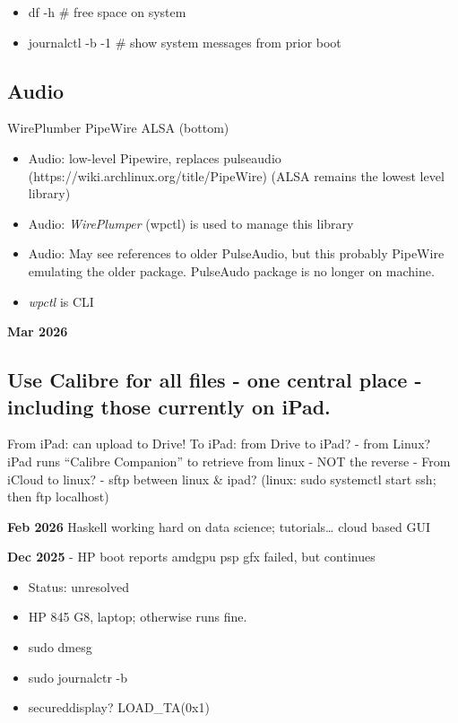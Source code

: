 \documentclass[
]{report}
\providecommand{\tightlist}{%
  \setlength{\itemsep}{0pt}\setlength{\parskip}{0pt}}\usepackage{longtable,booktabs,array}
\begin{document}
\begin{itemize}
\tightlist
\item
  df -h \# free space on system
\item
  journalctl -b -1 \# show system messages from prior boot
\end{itemize}

\subsection{Audio}\label{audio}

WirePlumber PipeWire ALSA (bottom)

\begin{itemize}
\tightlist
\item
  Audio: low-level Pipewire, replaces pulseaudio
  (https://wiki.archlinux.org/title/PipeWire) (ALSA remains the lowest
  level library)
\item
  Audio: \emph{WirePlumper} (wpctl) is used to manage this library
\item
  Audio: May see references to older PulseAudio, but this probably
  PipeWire emulating the older package. PulseAudo package is no longer
  on machine.
\item
  \emph{wpctl} is CLI
\end{itemize}

\textbf{Mar 2026}

\subsection{Use Calibre for all files - one central place - including
those currently on
iPad.}\label{use-calibre-for-all-files---one-central-place---including-those-currently-on-ipad.}

From iPad: can upload to Drive! To iPad: from Drive to iPad? - from
Linux? iPad runs ``Calibre Companion'' to retrieve from linux - NOT the
reverse - From iCloud to linux? - sftp between linux \& ipad? (linux:
sudo systemctl start ssh; then ftp localhost)

\textbf{Feb 2026} Haskell working hard on data science;
tutorials\ldots{} cloud based GUI

\textbf{Dec 2025} - HP boot reports amdgpu psp gfx failed, but continues

\begin{itemize}
\tightlist
\item
  Status: unresolved
\item
  HP 845 G8, laptop; otherwise runs fine.
\item
  sudo dmesg
\item
  sudo journalctr -b
\item
  secureddisplay? LOAD\_TA(0x1)
\end{itemize}
\end{document}

